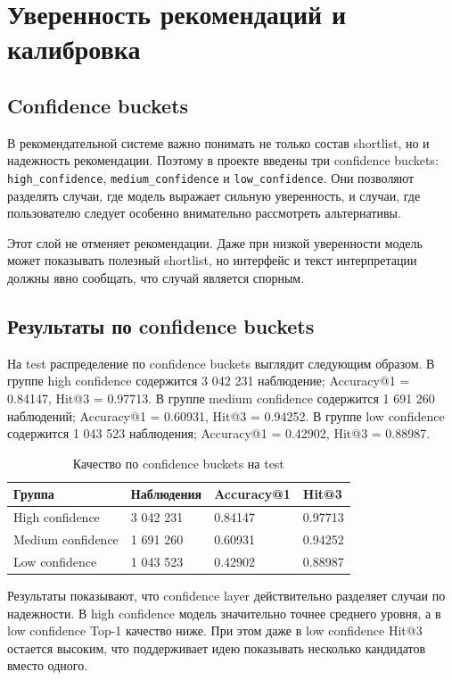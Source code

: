 \documentclass[a4paper,article,14pt]{extarticle}
\begin{document}
\section{Уверенность рекомендаций и калибровка}

\subsection{Confidence buckets}

В рекомендательной системе важно понимать не только состав shortlist, но и надежность рекомендации. Поэтому в проекте введены три confidence buckets: \texttt{high\_confidence}, \texttt{medium\_confidence} и \texttt{low\_confidence}. Они позволяют разделять случаи, где модель выражает сильную уверенность, и случаи, где пользователю следует особенно внимательно рассмотреть альтернативы.

Этот слой не отменяет рекомендации. Даже при низкой уверенности модель может показывать полезный shortlist, но интерфейс и текст интерпретации должны явно сообщать, что случай является спорным.

\subsection{Результаты по confidence buckets}

На test распределение по confidence buckets выглядит следующим образом. В группе high confidence содержится 3 042 231 наблюдение; Accuracy@1 = 0.84147, Hit@3 = 0.97713. В группе medium confidence содержится 1 691 260 наблюдений; Accuracy@1 = 0.60931, Hit@3 = 0.94252. В группе low confidence содержится 1 043 523 наблюдения; Accuracy@1 = 0.42902, Hit@3 = 0.88987.

\begin{center}
\begin{longtable}{|p{4cm}|p{3cm}|p{3cm}|p{3cm}|}
\caption{Качество по confidence buckets на test}\\
\hline
Группа & Наблюдения & Accuracy@1 & Hit@3\\
\hline
High confidence & 3 042 231 & 0.84147 & 0.97713\\
\hline
Medium confidence & 1 691 260 & 0.60931 & 0.94252\\
\hline
Low confidence & 1 043 523 & 0.42902 & 0.88987\\
\hline
\end{longtable}
\end{center}

Результаты показывают, что confidence layer действительно разделяет случаи по надежности. В high confidence модель значительно точнее среднего уровня, а в low confidence Top-1 качество ниже. При этом даже в low confidence Hit@3 остается высоким, что поддерживает идею показывать несколько кандидатов вместо одного.
\end{document}

